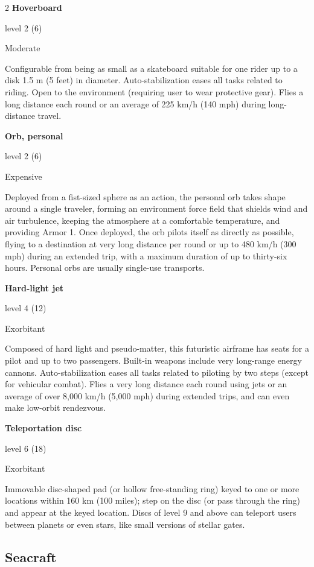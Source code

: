\begin{multicols}{2}
\textbf{Hoverboard} 

level 2 (6) 

Moderate 

Configurable from being as small as a skateboard suitable for one rider up to a disk 1.5 m (5 feet) in diameter. Auto-stabilization eases all tasks related to riding. Open to the environment (requiring user to wear protective gear). Flies a long distance each round or an average of 225 km/h (140 mph) during long-distance travel. 

\textbf{Orb, personal}

level 2 (6) 

Expensive 

Deployed from a fist-sized sphere as an action, the personal orb takes shape around a single traveler, forming an environment force field that shields wind and air turbulence, keeping the atmosphere at a comfortable temperature, and providing Armor 1. Once deployed, the orb pilots itself as directly as possible, flying to a destination at very long distance per round or up to 480 km/h (300 mph) during an extended trip, with a maximum duration of up to thirty-six hours. Personal orbs are usually single-use transports.

\textbf{Hard-light jet} 

level 4 (12) 

Exorbitant 

Composed of hard light and pseudo-matter, this futuristic airframe has seats for a pilot and up to two passengers. Built-in weapons include very long-range energy cannons. Auto-stabilization eases all tasks related to piloting by two steps (except for vehicular combat). Flies a very long distance each round using jets or an average of over 8,000 km/h (5,000 mph) during extended trips, and can even make low-orbit rendezvous. 

\textbf{Teleportation disc} 

level 6 (18) 

Exorbitant 

Immovable disc-shaped pad (or hollow free-standing ring) keyed to one or more locations within 160 km (100 miles); step on the disc (or pass through the ring) and appear at the keyed location. Discs of level 9 and above can teleport users between planets or even stars, like small versions of stellar gates.

\end{multicols}

\subsection{Seacraft}

